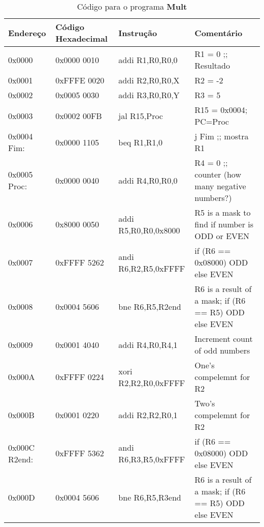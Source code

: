 \documentclass[12pt]{article}
\begin{document}
\begin{table}[H]
    \centering
    \caption{Código para o programa \textbf{Mult}}
    \begin{tabular}{|l|l|l|l|}\hline
        \textbf{Endereço} & \textbf{Código Hexadecimal} & \textbf{Instrução} & \textbf{Comentário}                 \\\hline
        0x0000        & 0x0000 0010 & addi R1,R0,R0,0      & R1 = 0 ;; Resultado                                   \\\hline
        0x0001        & 0xFFFE 0020 & addi R2,R0,R0,X      & R2 = -2                                               \\\hline
        0x0002        & 0x0005 0030 & addi R3,R0,R0,Y      & R3 = 5                                                \\\hline
        0x0003        & 0x0002 00FB & jal  R15,Proc        & R15 = 0x0004; PC=Proc                                 \\\hline
        0x0004 Fim:   & 0x0000 1105 & beq  R1,R1,0         & j Fim ;; mostra R1                                    \\\hline
        0x0005 Proc:  & 0x0000 0040 & addi R4,R0,R0,0      & R4 = 0 ;; counter (how many negative numbers?)        \\\hline
        0x0006        & 0x8000 0050 & addi R5,R0,R0,0x8000 & R5 is a mask to find if number is ODD or EVEN         \\\hline
        0x0007        & 0xFFFF 5262 & andi R6,R2,R5,0xFFFF & if (R6 == 0x08000) ODD else EVEN                      \\\hline
        0x0008        & 0x0004 5606 & bne  R6,R5,R2end     & R6 is a result of a mask; if (R6 == R5) ODD else EVEN \\\hline
        0x0009        & 0x0001 4040 & addi R4,R0,R4,1      & Increment count of odd numbers                        \\\hline
        0x000A        & 0xFFFF 0224 & xori R2,R2,R0,0xFFFF & One's compelemnt for R2                               \\\hline
        0x000B        & 0x0001 0220 & addi R2,R2,R0,1      & Two's compelemnt for R2                               \\\hline
        0x000C R2end: & 0xFFFF 5362 & andi R6,R3,R5,0xFFFF & if (R6 == 0x08000) ODD else EVEN                      \\\hline
        0x000D        & 0x0004 5606 & bne  R6,R5,R3end     & R6 is a result of a mask; if (R6 == R5) ODD else EVEN \\\hline

\end{tabular}
\end{table}
\end{document}
